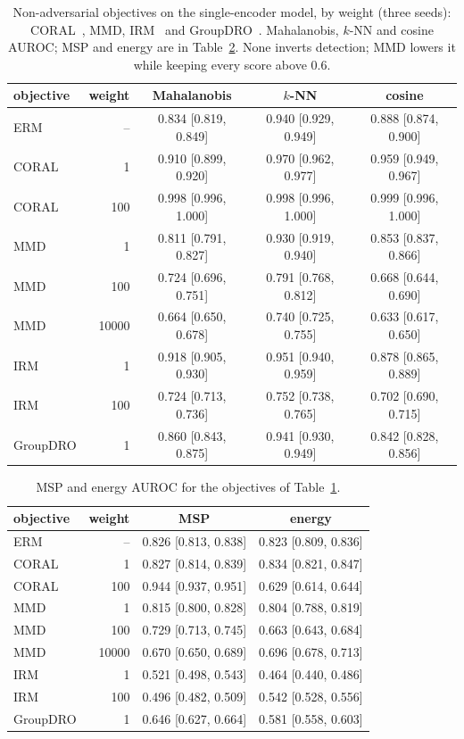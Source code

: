 \documentclass{midl}
\begin{document}
\begin{table}[h]
\centering
\caption{Non-adversarial objectives on the single-encoder model, by weight (three seeds): CORAL~\cite{sun2016coral},
MMD, IRM~\cite{arjovsky2019} and GroupDRO~\cite{sagawa2020}. Mahalanobis, $k$-NN and cosine AUROC; MSP and energy are in Table~\ref{tab:obj-b}.
None inverts detection; MMD lowers it while keeping every score above $0.6$.}
\label{tab:obj}
\begin{tabular}{lrccc}
\toprule
objective & weight & Mahalanobis & $k$-NN & cosine \\
\midrule
ERM & -- & 0.834 [0.819, 0.849] & 0.940 [0.929, 0.949] & 0.888 [0.874, 0.900] \\
CORAL & 1 & 0.910 [0.899, 0.920] & 0.970 [0.962, 0.977] & 0.959 [0.949, 0.967] \\
CORAL & 100 & 0.998 [0.996, 1.000] & 0.998 [0.996, 1.000] & 0.999 [0.996, 1.000] \\
MMD & 1 & 0.811 [0.791, 0.827] & 0.930 [0.919, 0.940] & 0.853 [0.837, 0.866] \\
MMD & 100 & 0.724 [0.696, 0.751] & 0.791 [0.768, 0.812] & 0.668 [0.644, 0.690] \\
MMD & 10000 & 0.664 [0.650, 0.678] & 0.740 [0.725, 0.755] & 0.633 [0.617, 0.650] \\
IRM & 1 & 0.918 [0.905, 0.930] & 0.951 [0.940, 0.959] & 0.878 [0.865, 0.889] \\
IRM & 100 & 0.724 [0.713, 0.736] & 0.752 [0.738, 0.765] & 0.702 [0.690, 0.715] \\
GroupDRO & 1 & 0.860 [0.843, 0.875] & 0.941 [0.930, 0.949] & 0.842 [0.828, 0.856] \\
\bottomrule
\end{tabular}
\end{table}

\begin{table}[h]
\centering
\caption{MSP and energy AUROC for the objectives of Table~\ref{tab:obj}.}
\label{tab:obj-b}
\begin{tabular}{lrcc}
\toprule
objective & weight & MSP & energy \\
\midrule
ERM & -- & 0.826 [0.813, 0.838] & 0.823 [0.809, 0.836] \\
CORAL & 1 & 0.827 [0.814, 0.839] & 0.834 [0.821, 0.847] \\
CORAL & 100 & 0.944 [0.937, 0.951] & 0.629 [0.614, 0.644] \\
MMD & 1 & 0.815 [0.800, 0.828] & 0.804 [0.788, 0.819] \\
MMD & 100 & 0.729 [0.713, 0.745] & 0.663 [0.643, 0.684] \\
MMD & 10000 & 0.670 [0.650, 0.689] & 0.696 [0.678, 0.713] \\
IRM & 1 & 0.521 [0.498, 0.543] & 0.464 [0.440, 0.486] \\
IRM & 100 & 0.496 [0.482, 0.509] & 0.542 [0.528, 0.556] \\
GroupDRO & 1 & 0.646 [0.627, 0.664] & 0.581 [0.558, 0.603] \\
\bottomrule
\end{tabular}
\end{table}
\end{document}
